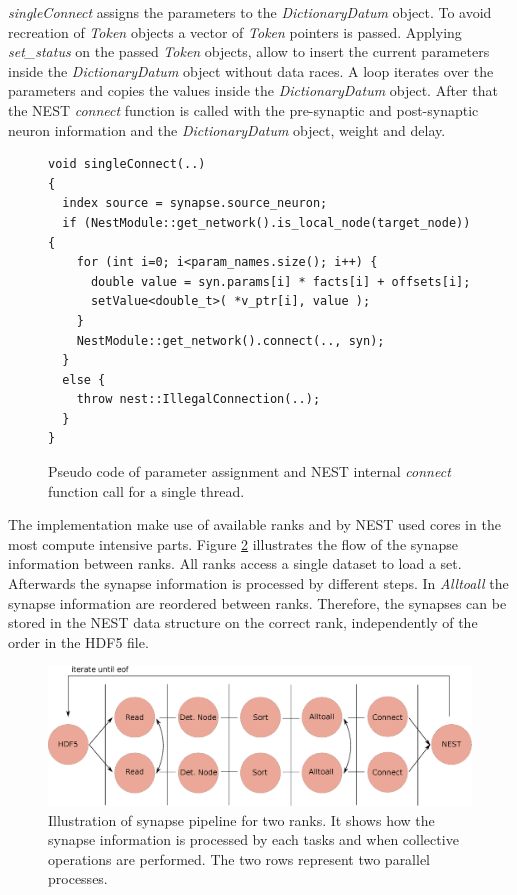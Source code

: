 \emph{singleConnect} assigns the parameters to the \emph{DictionaryDatum} object.
To avoid recreation of \emph{Token} objects a vector of  \emph{Token} pointers is
passed. Applying \emph{set\_{}status} on the passed \emph{Token} objects, allow to
insert the current parameters inside the \emph{DictionaryDatum} object without data races.
A loop iterates over the parameters and copies the values inside the \emph{DictionaryDatum} object.
After that the NEST \emph{connect} function is called with the pre-synaptic and post-synaptic
neuron information and the \emph{DictionaryDatum} object, weight and delay.
\begin{figure}[ht!]
\begin{lstlisting}[style=cppcode]
void singleConnect(..)
{
  index source = synapse.source_neuron;
  if (NestModule::get_network().is_local_node(target_node)) { 
    for (int i=0; i<param_names.size(); i++) {
      double value = syn.params[i] * facts[i] + offsets[i];
      setValue<double_t>( *v_ptr[i], value );
    }
    NestModule::get_network().connect(.., syn);
  }
  else {
    throw nest::IllegalConnection(..);
  }
}
\end{lstlisting}
\caption{Pseudo code of parameter assignment and NEST internal \emph{connect} function call for a single thread.}
\label{fig:singleConnect}
\end{figure}

The implementation make use of available ranks and by NEST used cores in the most compute intensive parts.
Figure \ref{fig:ConnectInsideIteration} illustrates the flow of the synapse information between ranks. 
All ranks access a single dataset to load a set. Afterwards the synapse information is processed by different steps.
In \emph{Alltoall} the synapse information are reordered between ranks.
Therefore, the synapses can be stored in the NEST data structure on the correct rank,
independently of the order in the HDF5 file.
\begin{figure}[ht!]
\centering
\includegraphics[scale=0.4]{pictures/Connect_inside_iteration.eps}
\caption[Illustration of synapse pipeline for two ranks]{Illustration of synapse pipeline for two ranks. It shows how the synapse information is processed by each tasks and when collective operations are performed.
The two rows represent two parallel processes.}
\label{fig:ConnectInsideIteration}
\end{figure}
\newpage
